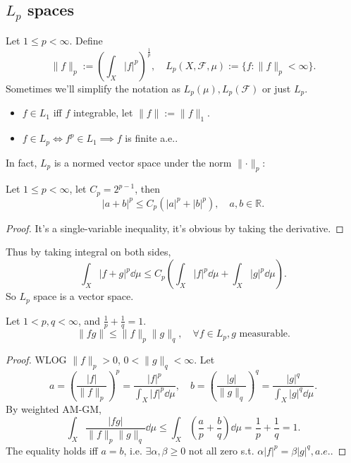 \subsection{$L_p$ spaces}
\label{sub:$L_p$ spaces}
\begin{definition}[$L_p$ spaces]
	Let $1\le p < \infty$.
	Define
	\[
	\lVert f \rVert _p := \left(\int_X |f|^p\right)^{\frac{1}{p}},\quad
	L_p(X, \mathscr{F}, \mu) := \{f : \lVert f \rVert _p < \infty\}.
	\]
	Sometimes we'll simplify the notation as $L_p(\mu), L_p(\mathscr{F})$ or
	just $L_p$.
\end{definition}

\begin{itemize}
	\item $f\in L_1$ iff $f$ integrable, let $ \lVert f \rVert := \lVert f \rVert _1$.
	\item $f\in L_p \iff f^p \in L_1\implies f$ is finite a.e..
\end{itemize}

In fact, $L_p$ is a normed vector space under the norm $\lVert \cdot \rVert_p$:
\begin{lemma}
	Let $1 \le p < \infty$, let $C_p = 2^{p-1}$, then
	\[
	|a+b|^p \le C_p (|a|^p + |b|^p), \quad a,b\in \mathbb{R}.
	\]
\end{lemma}
\begin{proof}[Proof]
    It's a single-variable inequality, it's obvious by taking the derivative.
\end{proof}
Thus by taking integral on both sides,
 \[
\int_X |f + g|^p\dd\mu \le C_p \left(\int_X |f|^p\dd\mu + \int_X |g|^p \dd \mu\right).
\]
So $L_p$ space is a vector space.
\begin{lemma}
	Let $1< p,q < \infty$, and $\frac{1}{p}+\frac{1}{q}=1$.
	\[
	\lVert f g \rVert \le \lVert f \rVert _p \lVert g \rVert _q,\quad
	\forall f\in L_p, g \text{ measurable}.
	\]
\end{lemma}
\begin{proof}[Proof]
    WLOG $\lVert f \rVert _p > 0$, $0 < \lVert g \rVert_q < \infty$.
	Let
	\[
	a = \left(\frac{|f|}{\lVert f \rVert _p}\right)^p
	= \frac{|f|^p}{\int_X |f|^p \dd \mu},
	\quad b = \left(\frac{|g|}{\lVert g \rVert _q}\right)^q
	= \frac{|g|^q}{\int_X |g|^q\dd \mu}.
	\]
	By weighted AM-GM,
	\[
	\int_X \frac{|fg|}{\lVert f \rVert _p \lVert g \rVert _q}\dd \mu
	\le \int_X \left(\frac{a}{p} + \frac{b}{q}\right)\dd \mu
	= \frac{1}{p} + \frac{1}{q} = 1.
	\]
	The equality holds iff $a = b$, i.e. $\exists \alpha, \beta\ge 0$ not all zero
	s.t. $\alpha|f|^p = \beta|g|^q, a.e.$.
\end{proof}

